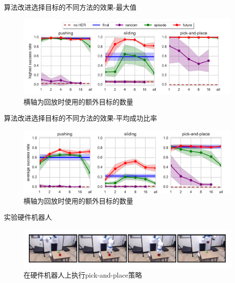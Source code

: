 \documentclass[10pt]{beamer}
\begin{document}
	\begin{frame}{算法改进}{选择目标的不同方法的效果-最大值}
		\begin{figure}
			\centering
			\includegraphics[width=0.9\linewidth]{pictures/her-with-additional-goals-highest}
			\caption{横轴为回放时使用的额外目标的数量}
			\label{fig:her-with-additional-goals-highest}
		\end{figure}
	
	\end{frame}

	\begin{frame}{算法改进}{选择目标的不同方法的效果-平均成功比率}
		\begin{figure}
			\centering
			\includegraphics[width=0.9\linewidth]{pictures/her-with-additional-goals-avg-success}
			\caption{横轴为回放时使用的额外目标的数量}
			\label{fig:her-with-additional-goals-avg-success}
		\end{figure}
	\end{frame}

	\begin{frame}{实验}{硬件机器人}
		\begin{figure}
			\centering
			\includegraphics[width=0.9\linewidth]{pictures/physical-robot}
			\caption{在硬件机器人上执行pick-and-place策略}
			\label{fig:physical-robot}
		\end{figure}
	\end{frame}
\end{document}
